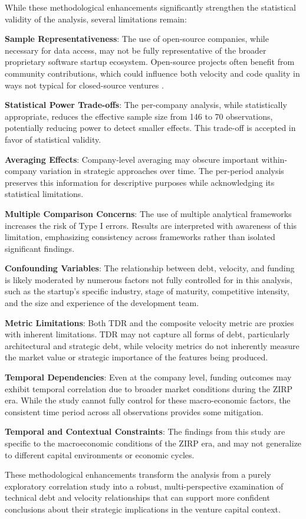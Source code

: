 While these methodological enhancements significantly strengthen the statistical validity of the analysis, several limitations remain:

\textbf{Sample Representativeness}: The use of open-source companies, while necessary for data access, may not be fully representative of the broader proprietary software startup ecosystem. Open-source projects often benefit from community contributions, which could influence both velocity and code quality in ways not typical for closed-source ventures \citep{colazo2010collaboration}.

\textbf{Statistical Power Trade-offs}: The per-company analysis, while statistically appropriate, reduces the effective sample size from 146 to 70 observations, potentially reducing power to detect smaller effects. This trade-off is accepted in favor of statistical validity.

\textbf{Averaging Effects}: Company-level averaging may obscure important within-company variation in strategic approaches over time. The per-period analysis preserves this information for descriptive purposes while acknowledging its statistical limitations.

\textbf{Multiple Comparison Concerns}: The use of multiple analytical frameworks increases the risk of Type I errors. Results are interpreted with awareness of this limitation, emphasizing consistency across frameworks rather than isolated significant findings.

\textbf{Confounding Variables}: The relationship between debt, velocity, and funding is likely moderated by numerous factors not fully controlled for in this analysis, such as the startup's specific industry, stage of maturity, competitive intensity, and the size and experience of the development team.

\textbf{Metric Limitations}: Both \ac{TDR} and the composite velocity metric are proxies with inherent limitations. \ac{TDR} may not capture all forms of debt, particularly architectural and strategic debt, while velocity metrics do not inherently measure the market value or strategic importance of the features being produced.

\textbf{Temporal Dependencies}: Even at the company level, funding outcomes may exhibit temporal correlation due to broader market conditions during the \ac{ZIRP} era. While the study cannot fully control for these macro-economic factors, the consistent time period across all observations provides some mitigation.

\textbf{Temporal and Contextual Constraints}: The findings from this study are specific to the macroeconomic conditions of the \ac{ZIRP} era, and may not generalize to different capital environments or economic cycles.

These methodological enhancements transform the analysis from a purely exploratory correlation study into a robust, multi-perspective examination of technical debt and velocity relationships that can support more confident conclusions about their strategic implications in the venture capital context.